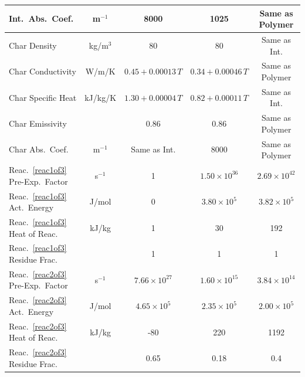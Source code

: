\begin{table}[!h]
\begin{tabular}{|l|c|c|c|c|}
Int.~Abs.~Coef.                          & m$^{-1}$      & 8000                    & 1025                    & Same as Polymer          \\ \hline
Char Density                             & kg/m$^3$      & 80                      & 80                      & Same as Int.             \\ \hline
Char Conductivity                        & W/m/K         & $0.45+0.00013 \, T$     & $0.34+0.00046  \, T$    & Same as Polymer          \\ \hline
Char Specific Heat                       & kJ/kg/K       & $1.30+0.00004 \, T$     & $0.82+0.00011 \, T$     & Same as Int.             \\ \hline
Char Emissivity                          &               & 0.86                    & 0.86                    & Same as Polymer          \\ \hline
Char Abs.~Coef.                          & m$^{-1}$      & Same as Int.            & 8000                    & Same as Polymer          \\ \hline
Reac.~\ref{reac1of3} Pre-Exp.~Factor     & s$^{-1}$      & 1                       & $1.50\times 10^{36}$    & $2.69\times 10^{42}$     \\ \hline
Reac.~\ref{reac1of3} Act.~Energy         & J/mol       & 0                       & $3.80\times 10^5$       & $3.82\times 10^5$        \\ \hline
Reac.~\ref{reac1of3} Heat of Reac.       & kJ/kg         & 1                       & 30                      & 192                      \\ \hline
Reac.~\ref{reac1of3} Residue Frac.       &               & 1                       & 1                       & 1                        \\ \hline
Reac.~\ref{reac2of3} Pre-Exp.~Factor     & s$^{-1}$      & $7.66\times 10^{27}$    & $1.60\times 10^{15}$    & $3.84\times 10^{14}$     \\ \hline
Reac.~\ref{reac2of3} Act.~Energy         & J/mol       & $4.65\times 10^5$       & $2.35\times 10^5$       & $2.00\times 10^5$        \\ \hline
Reac.~\ref{reac2of3} Heat of Reac.       & kJ/kg         & -80                     & 220                     & 1192                     \\ \hline
Reac.~\ref{reac2of3} Residue Frac.       &               & 0.65                    & 0.18                    & 0.4                      \\ \hline

\end{tabular}
\end{table}
